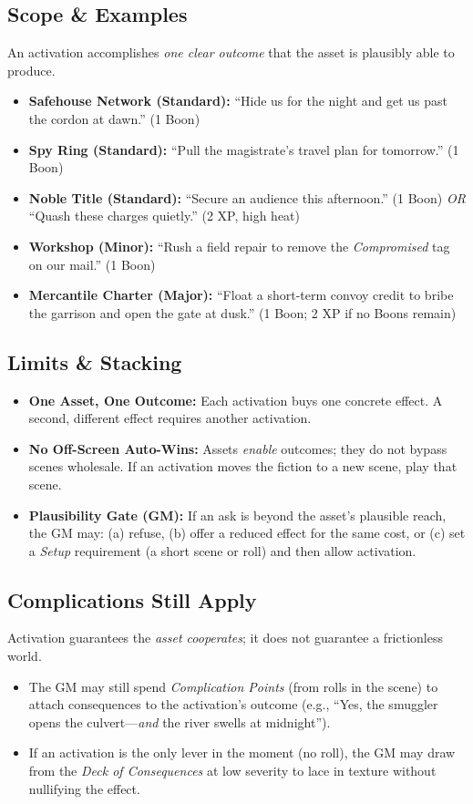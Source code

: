 \documentclass[12pt]{book}
\begin{document}
\subsection*{Scope \& Examples}
An activation accomplishes \emph{one clear outcome} that the asset is plausibly able to produce.
\begin{itemize}
  \item \textbf{Safehouse Network (Standard):} ``Hide us for the night and get us past the cordon at dawn.'' (1 Boon)
  \item \textbf{Spy Ring (Standard):} ``Pull the magistrate’s travel plan for tomorrow.'' (1 Boon)
  \item \textbf{Noble Title (Standard):} ``Secure an audience this afternoon.'' (1 Boon) \emph{OR} ``Quash these charges quietly.'' (2 XP, high heat)
  \item \textbf{Workshop (Minor):} ``Rush a field repair to remove the \emph{Compromised} tag on our mail.'' (1 Boon)
  \item \textbf{Mercantile Charter (Major):} ``Float a short-term convoy credit to bribe the garrison and open the gate at dusk.'' (1 Boon; 2 XP if no Boons remain)
\end{itemize}

\subsection*{Limits \& Stacking}
\begin{itemize}
  \item \textbf{One Asset, One Outcome:} Each activation buys one concrete effect. A second, different effect requires another activation.
  \item \textbf{No Off-Screen Auto-Wins:} Assets \emph{enable} outcomes; they do not bypass scenes wholesale. If an activation moves the fiction to a new scene, play that scene.
  \item \textbf{Plausibility Gate (GM):} If an ask is beyond the asset’s plausible reach, the GM may: (a) refuse, (b) offer a reduced effect for the same cost, or (c) set a \emph{Setup} requirement (a short scene or roll) and then allow activation.
\end{itemize}

\subsection*{Complications Still Apply}
Activation guarantees the \emph{asset cooperates}; it does not guarantee a frictionless world.
\begin{itemize}
  \item The GM may still spend \emph{Complication Points} (from rolls in the scene) to attach consequences to the activation’s outcome (e.g., ``Yes, the smuggler opens the culvert—\emph{and} the river swells at midnight'').
  \item If an activation is the only lever in the moment (no roll), the GM may draw from the \emph{Deck of Consequences} at low severity to lace in texture without nullifying the effect.
\end{itemize}
\end{document}
